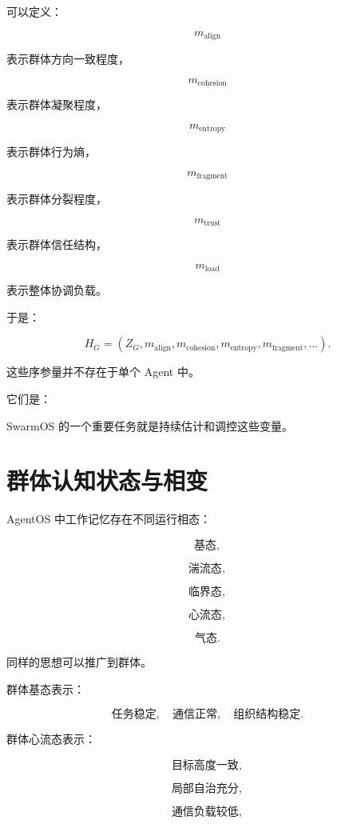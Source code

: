 可以定义：

\[
m_{\mathrm{align}}
\]

表示群体方向一致程度，

\[
m_{\mathrm{cohesion}}
\]

表示群体凝聚程度，

\[
m_{\mathrm{entropy}}
\]

表示群体行为熵，

\[
m_{\mathrm{fragment}}
\]

表示群体分裂程度，

\[
m_{\mathrm{trust}}
\]

表示群体信任结构，

\[
m_{\mathrm{load}}
\]

表示整体协调负载。

于是：

\[
H_G
=
\left(
Z_G,
m_{\mathrm{align}},
m_{\mathrm{cohesion}},
m_{\mathrm{entropy}},
m_{\mathrm{fragment}},
\dots
\right).
\]

这些序参量并不存在于单个 Agent 中。

它们是：

\begin{statementbox}
\centering
{}
\end{statementbox}

SwarmOS 的一个重要任务就是持续估计和调控这些变量。


\section{群体认知状态与相变}

AgentOS 中工作记忆存在不同运行相态：

\[
\text{基态},
\]

\[
\text{湍流态},
\]

\[
\text{临界态},
\]

\[
\text{心流态},
\]

\[
\text{气态}.
\]

同样的思想可以推广到群体。

群体基态表示：

\[
\text{任务稳定},
\quad
\text{通信正常},
\quad
\text{组织结构稳定}.
\]

群体心流态表示：

\[
\text{目标高度一致},
\]

\[
\text{局部自治充分},
\]

\[
\text{通信负载较低},
\]

